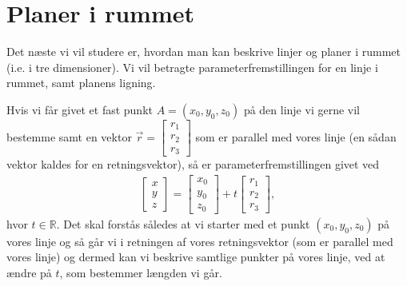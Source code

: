\section{Planer i rummet}
\noindent Det næste vi vil studere er, hvordan man kan beskrive linjer og planer i rummet (i.e. i tre dimensioner). Vi vil betragte parameterfremstillingen for en linje i rummet, samt planens ligning.

Hvis vi får givet et fast punkt $A=(x_0,y_0,z_0)$ på den linje vi gerne vil bestemme samt en vektor $\vec{r}=\begin{bmatrix}r_1\\r_2\\r_3 \end{bmatrix}$ som er parallel med vores linje (en sådan vektor kaldes for en retningsvektor), så er parameterfremstillingen givet ved
\begin{align}\label{eq:vec3d2et}
\begin{bmatrix}x \\ y \\ z\end{bmatrix} = \begin{bmatrix}x_0 \\y_0 \\ z_0\end{bmatrix}  +t
\begin{bmatrix}r_1 \\r_2 \\ r_3 \end{bmatrix},
\end{align}
hvor $t \in \mathbb{R}$. Det skal forstås således at vi starter med et punkt $(x_0,y_0,z_0)$ på vores linje og så går vi i retningen af vores retningsvektor (som er parallel med vores linje) og dermed kan vi beskrive samtlige punkter på vores linje, ved at ændre på $t$, som bestemmer længden vi går.

